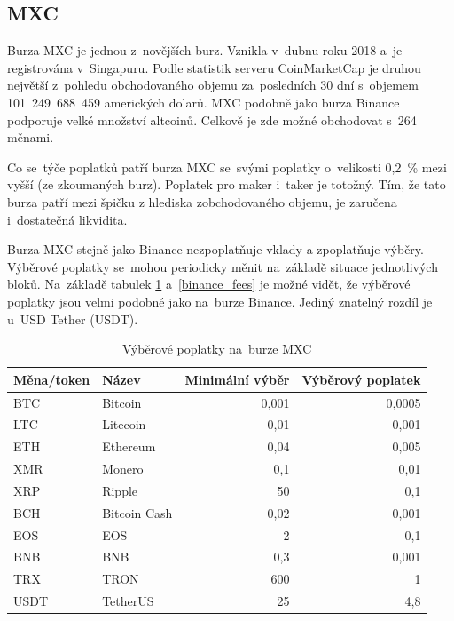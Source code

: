\documentclass[thesis=B,czech]{FITthesis}[2019/03/21]
\begin{document}
\subsection{MXC}
Burza MXC je jednou z~novějších burz. Vznikla v~dubnu roku 2018 a~je registrována v~Singapuru. Podle statistik serveru CoinMarketCap je druhou největší z~pohledu obchodovaného objemu za~posledních 30 dní s~objemem 101~249~688~459 amerických dolarů. \cite{coinmarketcap} MXC podobně jako burza Binance podporuje velké množství altcoinů. Celkově je zde možné obchodovat s~264 měnami. \cite{mxc_coins}

Co se~týče poplatků patří burza MXC se~svými poplatky o~velikosti 0,2~\% mezi vyšší (ze zkoumaných burz). Poplatek pro maker i~taker je totožný. Tím, že tato burza patří mezi špičku z hlediska zobchodovaného objemu, je zaručena i~dostatečná likvidita. \cite{cryptowisser_mxc} 

Burza MXC stejně jako Binance nezpoplatňuje vklady a zpoplatňuje výběry. Výběrové poplatky se~mohou periodicky měnit na~základě situace jednotlivých bloků. \cite{mxc_fees} Na~základě tabulek \ref{mxc_fees} a~\ref{binance_fees} je možné vidět, že výběrové poplatky jsou velmi podobné jako na~burze Binance. Jediný znatelný rozdíl je u~USD Tether (USDT). \cite{cryptowisser_mxc}

\begin{table}\centering
    \caption{Výběrové poplatky na~burze MXC \cite{mxc_fees}}
    \label{mxc_fees}
     \begin{tabular}{||l | l | r | r||} 
     \hline
     Měna/token & Název & Minimální výběr & Výběrový poplatek \\ [0.5ex] 
     \hline\hline
     BTC & Bitcoin & 0,001 & 0,0005 \\ 
     \hline
     LTC & Litecoin & 0,01 & 0,001 \\
     \hline
     ETH & Ethereum & 0,04 & 0,005 \\
     \hline
     XMR & Monero & 0,1 & 0,01 \\
     \hline
     XRP & Ripple & 50 & 0,1 \\
     \hline
     BCH & Bitcoin Cash & 0,02 & 0,001 \\
     \hline
     EOS & EOS & 2 & 0,1 \\
     \hline
     BNB & BNB & 0,3 & 0,001 \\
     \hline
     TRX & TRON & 600 & 1 \\
     \hline
     USDT & TetherUS & 25 & 4,8 \\
     \hline
    \end{tabular}
\end{table}
\end{document}
